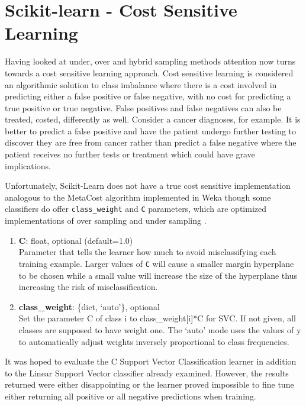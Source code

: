 \section{Scikit-learn - Cost Sensitive Learning}
\label{subsection:scikit-learn-cost}

Having looked at under, over and hybrid sampling methods attention now turns towards a cost sensitive learning approach. Cost sensitive learning is considered an algorithmic solution to class imbalance where there is a cost involved in predicting either a false positive or false negative, with no cost for predicting a true positive or true negative. False positives and false negatives can also be treated, costed, differently as well. Consider a cancer diagnoses, for example. It is better to predict a false positive and have the patient undergo further testing to discover they are free from cancer rather than predict a false negative where the patient receives no further tests or treatment which could have grave implications.

Unfortunately, Scikit-Learn does not have a true cost sensitive implementation analogous to the MetaCost algorithm implemented in Weka though some classifiers do offer \verb|class_weight| and \verb|C| parameters, which are optimized implementations of over sampling and under sampling \cite{scikit-learn}. 

\begin{enumerate}

	\item \textbf{C}: float, optional (default=1.0) \\
	Parameter that tells the learner how much to avoid misclassifying each training example. Larger values of \verb|C| will cause a smaller margin hyperplane to be chosen while a small value will increase the size of the hyperplane thus increasing the risk of misclassification.
	
	\item \textbf{class\_weight}: \{dict, ‘auto’\}, optional \\
	Set the parameter C of class i to class\_weight[i]*C for SVC. If not given, all classes are supposed to have weight one. The ‘auto’ mode uses the values of y to automatically adjust weights inversely proportional to class frequencies.
	
\end{enumerate}

It was hoped to evaluate the C Support Vector Classification learner in addition to the Linear Support Vector classifier already examined. However, the results returned were either disappointing or the learner proved impossible to fine tune either returning all positive or all negative predictions when training. 
